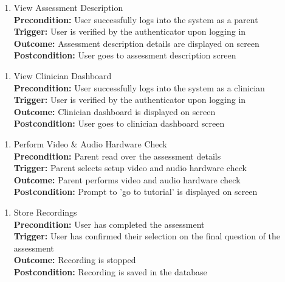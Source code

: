 \documentclass[12pt]{article}
\begin{document}
\begin{enumerate}[{PUC-}09. ]
  \item View Assessment Description\\
  \textbf{Precondition: }User successfully logs into the system as a parent\\
  \textbf{Trigger: }User is verified by the authenticator upon logging in\\
  \textbf{Outcome: }Assessment description details are displayed on screen\\
  \textbf{Postcondition: }User goes to assessment description screen\\
\end{enumerate}

\begin{enumerate}[{PUC-}10. ]
  \item View Clinician Dashboard\\
  \textbf{Precondition: }User successfully logs into the system as a clinician\\
  \textbf{Trigger: }User is verified by the authenticator upon logging in\\
  \textbf{Outcome: }Clinician dashboard is displayed on screen\\
  \textbf{Postcondition: }User goes to clinician dashboard screen\\
\end{enumerate}

\begin{enumerate}[{PUC-}11. ]
  \item Perform Video \& Audio Hardware Check\\
  \textbf{Precondition: }Parent read over the assessment details\\
  \textbf{Trigger: }Parent selects setup video and audio hardware check\\
  \textbf{Outcome: }Parent performs video and audio hardware check\\
  \textbf{Postcondition: }Prompt to 'go to tutorial' is displayed on screen\\
\end{enumerate}

\begin{enumerate}[{PUC-}12. ]
  \item Store Recordings\\
  \textbf{Precondition: }User has completed the assessment\\
  \textbf{Trigger: }User has confirmed their selection on the final question of the assessment\\
  \textbf{Outcome: }Recording is stopped\\
  \textbf{Postcondition: }Recording is saved in the database\\
\end{enumerate}
\end{document}
